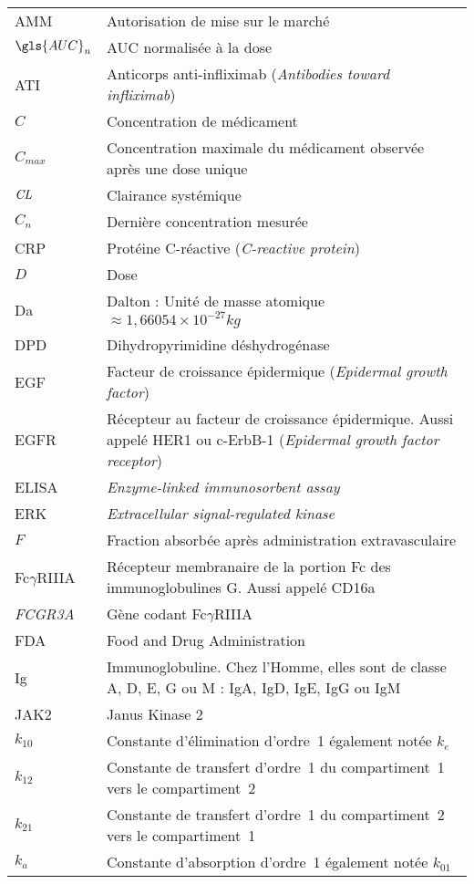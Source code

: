 \begin{tabularx}{30em}{X X}
AMM & 	Autorisation de mise sur le marché\\
$\gls{AUC}_n$ & 	AUC normalisée à la dose\\
ATI & 	Anticorps anti-infliximab (\textit{Antibodies toward infliximab})\\
$C$ & 	Concentration de médicament\\
$C_{max}$ & 	Concentration maximale du médicament observée après une dose unique\\
$\operatorname{\textit{CL}}$ & 	Clairance systémique\\
$C_n$ & 	Dernière concentration mesurée\\
CRP & 	Protéine C-réactive (\textit{C-reactive protein})\\
$D$ & 	Dose\\
Da & 	Dalton : Unité de masse atomique $\approx  1,66054\times 10^{-27} kg$\\
DPD & 	Dihydropyrimidine déshydrogénase\\
EGF & 	Facteur de croissance épidermique (\textit{Epidermal growth factor})\\
EGFR & 	Récepteur au facteur de croissance épidermique. Aussi appelé HER1 ou c-ErbB-1 (\textit{Epidermal growth factor receptor})\\
ELISA & 	\textit{Enzyme-linked immunosorbent assay}\\
ERK & 	\textit{Extracellular signal-regulated kinase}\\
$F$ & 	Fraction absorbée après administration extravasculaire\\
Fc$\gamma$RIIIA & 	Récepteur membranaire de la portion Fc des immunoglobulines G. Aussi appelé CD16a\\
\textit{FCGR3A} & 	Gène codant Fc$\gamma$RIIIA\\
FDA & 	Food and Drug Administration\\
Ig & 	Immunoglobuline. Chez l'Homme, elles sont de classe A, D, E, G ou M : IgA, IgD, IgE, IgG ou IgM \\
JAK2 & 	Janus Kinase 2\\
$k_{10}$ & 	Constante d'élimination d'ordre~1 également notée $k_e$\\
$k_{12}$ & 	Constante de transfert d'ordre~1 du compartiment~1 vers le compartiment~2\\
$k_{21}$ & 	Constante de transfert d'ordre~1 du compartiment~2 vers le compartiment~1\\
$k_a$ & 	Constante d'absorption d'ordre~1 également notée $k_{01}$\\

\end{tabularx}
